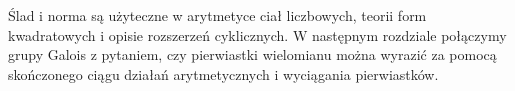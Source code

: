 \begin{uwaga}[Co dalej?]
\label{aa:uw:trace-norm-next}
Ślad i norma są użyteczne w arytmetyce ciał liczbowych,
teorii form kwadratowych i opisie rozszerzeń cyklicznych.
W następnym rozdziale połączymy grupy Galois z pytaniem,
czy pierwiastki wielomianu można wyrazić za pomocą
skończonego ciągu działań arytmetycznych i wyciągania pierwiastków.
\end{uwaga}
